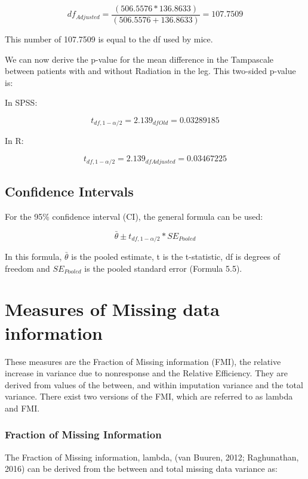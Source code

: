 \documentclass[]{book}
\theoremstyle{definition}
\theoremstyle{definition}
\theoremstyle{definition}
\theoremstyle{remark}
\begin{document}
\[df_{Adjusted} = \frac{(506.5576* 136.8633)}{(506.5576+ 136.8633)}=107.7509\]

This number of 107.7509 is equal to the df used by mice.

We can now derive the p-value for the mean difference in the Tampascale
between patients with and without Radiation in the leg. This two-sided
p-value is:

In SPSS:

\[t_{df,1-\alpha/2}=2.139_{df{Old}}=0.03289185\]

In R:

\[t_{df,1-\alpha/2}=2.139_{df{Adjusted}}=0.03467225\]

\section{Confidence Intervals}\label{confidence-intervals}

For the 95\% confidence interval (CI), the general formula can be used:

\begin{equation}
\bar{\theta} ± t_{df,1-\alpha/2} * SE_{Pooled}
  \label{eq:conf}
\end{equation}

In this formula, \(\bar{\theta}\) is the pooled estimate, t is the
t-statistic, df is degrees of freedom and \(SE_{Pooled}\) is the pooled
standard error (Formula 5.5).

\chapter{Measures of Missing data
information}\label{measures-of-missing-data-information}

These measures are the Fraction of Missing information (FMI), the
relative increase in variance due to nonresponse and the Relative
Efficiency. They are derived from values of the between, and within
imputation variance and the total variance. There exist two versions of
the FMI, which are referred to as lambda and FMI.

\subsection{Fraction of Missing
Information}\label{fraction-of-missing-information}

The Fraction of Missing information, lambda, (van Buuren, 2012;
Raghunathan, 2016) can be derived from the between and total missing
data variance as:
\end{document}
